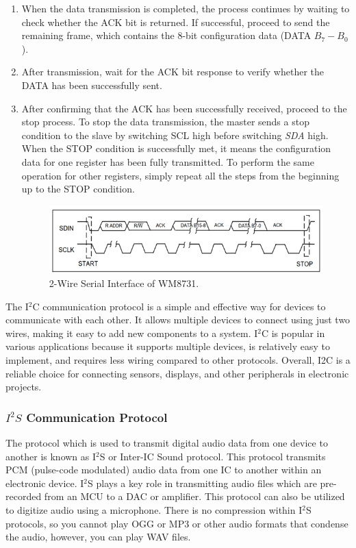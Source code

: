 \begin{enumerate}[label=\alph*) ]
\begin{enumerate}[label=Step \arabic*., leftmargin=2cm]
			\item When the data transmission is completed, the process continues by waiting to check whether the ACK bit is returned. If successful, proceed to send the remaining frame, which contains the 8-bit configuration data (DATA $B_{7} - B_{0}$).
			
			\item After transmission, wait for the ACK bit response to verify whether the DATA has been successfully sent.
			\item After confirming that the ACK has been successfully received, proceed to the stop process. To stop the data transmission, the master sends a stop condition to the slave by switching SCL high before switching \textit{SDA} high. When the STOP condition is successfully met, it means the configuration data for one register has been fully transmitted. To perform the same operation for other registers, simply repeat all the steps from the beginning up to the STOP condition.
			
			\begin{figure}[H]
				\centering
				\includegraphics[width=0.7\linewidth]{./my-chapters/my-images/theoretical_background/TWI_protocol.png}
				\caption{2-Wire Serial Interface of WM8731.}
			\end{figure}
		\end{enumerate}
\end{enumerate}

The I$^{2}$C communication protocol is a simple and effective way for devices to communicate with each other. It allows multiple devices to connect using just two wires, making it easy to add new components to a system. I$^{2}$C is popular in various applications because it supports multiple devices, is relatively easy to implement, and requires less wiring compared to other protocols. Overall, I2C is a reliable choice for connecting sensors, displays, and other peripherals in electronic projects.

\subsubsection{$I^{2}S$ Communication Protocol}

The protocol which is used to transmit digital audio data from one device to another is known as I$^{2}$S or Inter-IC Sound protocol. This protocol transmits PCM (pulse-code modulated) audio data from one IC to another within an electronic device. I$^{2}$S plays a key role in transmitting audio files which are pre-recorded from an MCU to a DAC or amplifier. This protocol can also be utilized to digitize audio using a microphone. There is no compression within I$^{2}$S protocols, so you cannot play OGG or MP3 or other audio formats that condense the audio, however, you can play WAV files.

